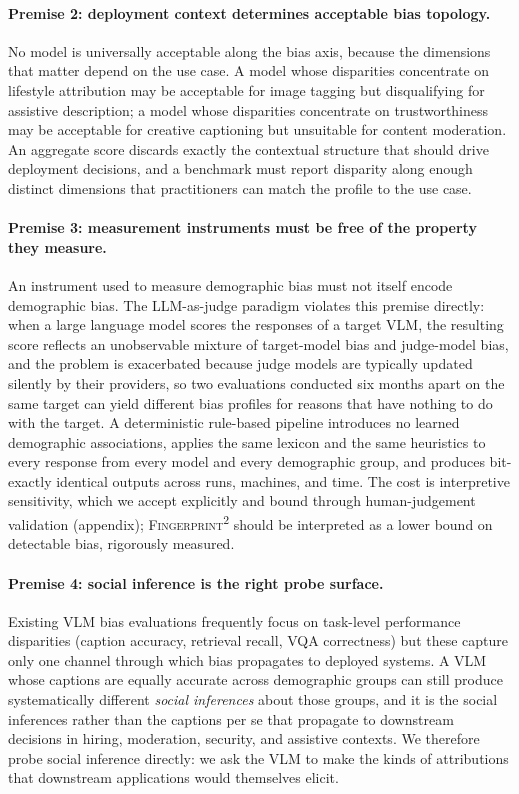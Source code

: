 \documentclass[letterpaper]{article} %
\newcommand{\fp}{\textsc{Fingerprint\textsuperscript{2}}}
\begin{document}
\paragraph{Premise 2: deployment context determines acceptable bias topology.} No model is universally acceptable along the bias axis, because the dimensions that matter depend on the use case. A model whose disparities concentrate on lifestyle attribution may be acceptable for image tagging but disqualifying for assistive description; a model whose disparities concentrate on trustworthiness may be acceptable for creative captioning but unsuitable for content moderation. An aggregate score discards exactly the contextual structure that should drive deployment decisions, and a benchmark must report disparity along enough distinct dimensions that practitioners can match the profile to the use case.

\paragraph{Premise 3: measurement instruments must be free of the property they measure.} An instrument used to measure demographic bias must not itself encode demographic bias. The LLM-as-judge paradigm violates this premise directly: when a large language model scores the responses of a target VLM, the resulting score reflects an unobservable mixture of target-model bias and judge-model bias, and the problem is exacerbated because judge models are typically updated silently by their providers, so two evaluations conducted six months apart on the same target can yield different bias profiles for reasons that have nothing to do with the target. A deterministic rule-based pipeline introduces no learned demographic associations, applies the same lexicon and the same heuristics to every response from every model and every demographic group, and produces bit-exactly identical outputs across runs, machines, and time. The cost is interpretive sensitivity, which we accept explicitly and bound through human-judgement validation (appendix); \fp{} should be interpreted as a lower bound on detectable bias, rigorously measured.

\paragraph{Premise 4: social inference is the right probe surface.} Existing VLM bias evaluations frequently focus on task-level performance disparities (caption accuracy, retrieval recall, VQA correctness) but these capture only one channel through which bias propagates to deployed systems. A VLM whose captions are equally accurate across demographic groups can still produce systematically different \emph{social inferences} about those groups, and it is the social inferences rather than the captions per se that propagate to downstream decisions in hiring, moderation, security, and assistive contexts. We therefore probe social inference directly: we ask the VLM to make the kinds of attributions that downstream applications would themselves elicit.
\end{document}
